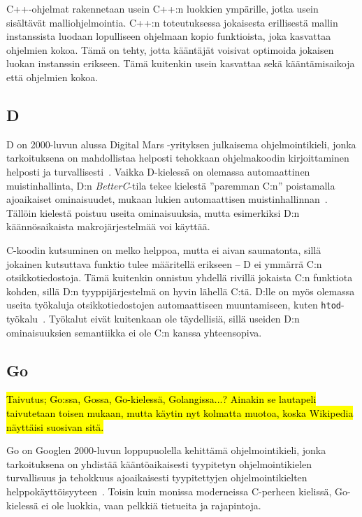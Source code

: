 C++-ohjelmat rakennetaan usein C++:n luokkien ympärille, jotka usein sisältävät
malliohjelmointia. C++:n toteutuksessa jokaisesta
erillisestä mallin instanssista luodaan lopulliseen ohjelmaan kopio
funktioista, joka kasvattaa ohjelmien kokoa. Tämä on tehty, jotta kääntäjät
voisivat optimoida jokaisen luokan instanssin erikseen. Tämä kuitenkin usein
kasvattaa sekä kääntämisaikoja että ohjelmien kokoa.

\subsection{D}

D on 2000-luvun alussa Digital Mars -yrityksen julkaisema ohjelmointikieli,
jonka tarkoituksena on mahdollistaa helposti tehokkaan ohjelmakoodin
kirjoittaminen helposti ja turvallisesti~\citep{dhistory}. Vaikka D-kielessä on
olemassa automaattinen muistinhallinta, D:n \emph{BetterC}-tila tekee kielestä
''paremman C:n'' poistamalla ajoaikaiset ominaisuudet, mukaan lukien
automaattisen muistinhallinnan~\citep{dbetterc}. Tällöin kielestä poistuu
useita ominaisuuksia, mutta esimerkiksi D:n käännösaikaista makrojärjestelmää
voi käyttää.

C-koodin kutsuminen on melko helppoa, mutta ei aivan saumatonta, sillä jokainen
kutsuttava funktio tulee määritellä erikseen -- D ei ymmärrä C:n
otsikkotiedostoja. Tämä kuitenkin onnistuu yhdellä rivillä jokaista C:n
funktiota kohden, sillä D:n tyyppijärjestelmä on hyvin lähellä C:tä. D:lle on
myös olemassa useita työkaluja otsikkotiedostojen automaattiseen muuntamiseen,
kuten \texttt{htod}-työkalu~\citep{htod}. Työkalut eivät kuitenkaan ole
täydellisiä, sillä useiden D:n ominaisuuksien semantiikka ei ole C:n kanssa
yhteensopiva.

\subsection{Go}

\hl{Taivutus; Go:ssa, Gossa, Go-kielessä, Golangissa...? Ainakin se lautapeli
taivutetaan toisen mukaan, mutta käytin nyt kolmatta muotoa, koska Wikipedia
näyttäisi suosivan sitä.}

Go on Googlen 2000-luvun loppupuolella kehittämä ohjelmointikieli, jonka
tarkoituksena on yhdistää kääntöaikaisesti tyypitetyn ohjelmointikielen
turvallisuus ja tehokkuus ajoaikaisesti tyypitettyjen ohjelmointikielten
helppokäyttöisyyteen~\citep{gohistory}. Toisin kuin monissa moderneissa
C-perheen kielissä, Go-kielessä ei ole luokkia, vaan pelkkiä tietueita ja
rajapintoja.

